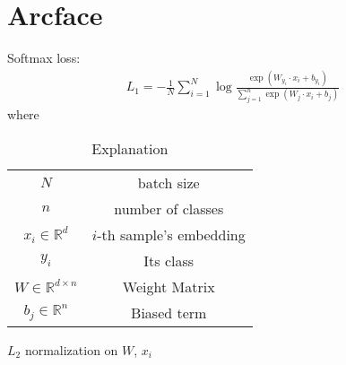 \documentclass[a4paper]{article}
\begin{document}
\newcommand{\bb}[1]{\mathbb{#1}}

\section{Arcface}

Softmax loss:
\begin{align*}
    L_1 = -\frac{1}{N} \sum_{i=1}^N \log \frac{\exp(W_{y_i} \cdot x_i + b_{y_i})}{
        \sum_{j=1}^n \exp(W_j \cdot x_i + b_j)}
\end{align*}
where
\begin{table}[ht]
\caption{Explanation}
\centering
\begin{tabular}{c c}
    $N$ & batch size \\
    $n$ & number of classes \\
    $x_i \in \bb{R}^d$ & $i$-th sample's embedding \\
    $y_i$ & Its class \\
    $W \in \bb{R}^{d \times n}$ & Weight Matrix \\
    $b_j \in \bb{R}^n$ & Biased term \\
\end{tabular}
\end{table}

$L_2$ normalization on $W$, $x_i$
\end{document}
